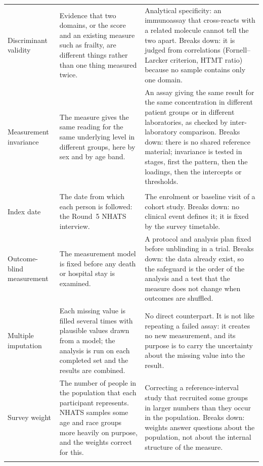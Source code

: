 \begin{longtable}{>{\raggedright\arraybackslash}p{2.7cm} >{\raggedright\arraybackslash}p{4.6cm} >{\raggedright\arraybackslash}p{6.6cm}}
Discriminant validity & Evidence that two domains, or the score and an existing measure such as frailty, are different things rather than one thing measured twice. & Analytical specificity: an immunoassay that cross-reacts with a related molecule cannot tell the two apart. Breaks down: it is judged from correlations (Fornell--Larcker criterion, HTMT ratio) because no sample contains only one domain. \\
Measurement invariance & The measure gives the same reading for the same underlying level in different groups, here by sex and by age band. & An assay giving the same result for the same concentration in different patient groups or in different laboratories, as checked by inter-laboratory comparison. Breaks down: there is no shared reference material; invariance is tested in stages, first the pattern, then the loadings, then the intercepts or thresholds. \\
\midrule
\multicolumn{3}{l}{\textit{Data and design}} \\
\addlinespace
Index date & The date from which each person is followed: the Round~5 NHATS interview. & The enrolment or baseline visit of a cohort study. Breaks down: no clinical event defines it; it is fixed by the survey timetable. \\
Outcome-blind measurement & The measurement model is fixed before any death or hospital stay is examined. & A protocol and analysis plan fixed before unblinding in a trial. Breaks down: the data already exist, so the safeguard is the order of the analysis and a test that the measure does not change when outcomes are shuffled. \\
Multiple imputation & Each missing value is filled several times with plausible values drawn from a model; the analysis is run on each completed set and the results are combined. & No direct counterpart. It is not like repeating a failed assay: it creates no new measurement, and its purpose is to carry the uncertainty about the missing value into the result. \\
Survey weight & The number of people in the population that each participant represents. NHATS samples some age and race groups more heavily on purpose, and the weights correct for this. & Correcting a reference-interval study that recruited some groups in larger numbers than they occur in the population. Breaks down: weights answer questions about the population, not about the internal structure of the measure. \\
\midrule
\multicolumn{3}{l}{\textit{Survival and prediction}} \\

\end{longtable}

